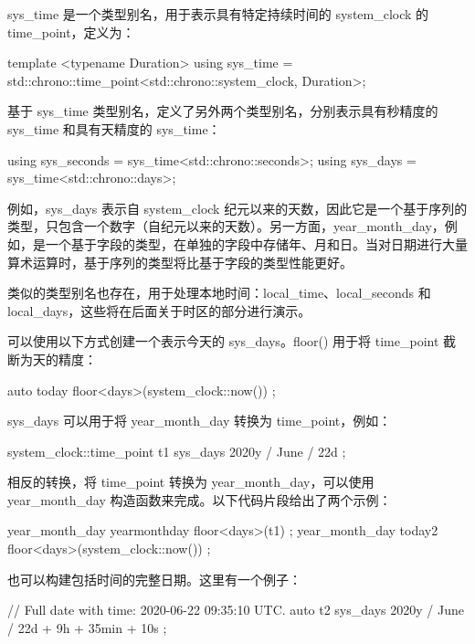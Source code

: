 sys\_time 是一个类型别名，用于表示具有特定持续时间的 system\_clock 的 time\_point，定义为：

\begin{cpp}
template <typename Duration>
using sys_time = std::chrono::time_point<std::chrono::system_clock, Duration>;
\end{cpp}

基于 sys\_time 类型别名，定义了另外两个类型别名，分别表示具有秒精度的 sys\_time 和具有天精度的 sys\_time：

\begin{cpp}
using sys_seconds = sys_time<std::chrono::seconds>;
using sys_days = sys_time<std::chrono::days>;
\end{cpp}

例如，sys\_days 表示自 system\_clock 纪元以来的天数，因此它是一个基于序列的类型，只包含一个数字（自纪元以来的天数）。另一方面，year\_month\_day，例如，是一个基于字段的类型，在单独的字段中存储年、月和日。当对日期进行大量算术运算时，基于序列的类型将比基于字段的类型性能更好。

类似的类型别名也存在，用于处理本地时间：local\_time、local\_seconds 和 local\_days，这些将在后面关于时区的部分进行演示。

可以使用以下方式创建一个表示今天的 sys\_days。floor() 用于将 time\_point 截断为天的精度：

\begin{cpp}
auto today { floor<days>(system_clock::now()) };
\end{cpp}

sys\_days 可以用于将 year\_month\_day 转换为 time\_point，例如：

\begin{cpp}
system_clock::time_point t1 { sys_days { 2020y / June / 22d } };
\end{cpp}

相反的转换，将 time\_point 转换为 year\_month\_day，可以使用 year\_month\_day 构造函数来完成。以下代码片段给出了两个示例：

\begin{cpp}
year_month_day yearmonthday { floor<days>(t1) };
year_month_day today2 { floor<days>(system_clock::now()) };
\end{cpp}

也可以构建包括时间的完整日期。这里有一个例子：

\begin{cpp}
// Full date with time: 2020-06-22 09:35:10 UTC.
auto t2 { sys_days { 2020y / June / 22d } + 9h + 35min + 10s };
\end{cpp}

